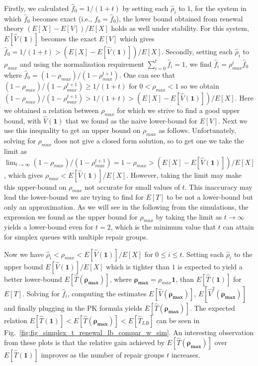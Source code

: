 \documentclass[sigconf,draft]{acmart}
\begin{document}
Firstly, we calculated $\hat{f}_0 = 1/(1+t)$ by setting each $\hat{\rho}_i$ to $1$, for the system in which $\hat{f}_0$ becomes exact (i.e., $f_0 = \hat{f}_0$), the lower bound obtained from renewal theory $(E[X]-E[V])/E[X]$ holds as well under stability. For this system, $E[\hat{V}(\bm{1})]$ becomes the exact $E[V]$ which gives $\hat{f}_0 = 1/(1+t) > (E[X]-E[\hat{V}(\bm{1})])/E[X]$. Secondly, setting each $\hat{\rho}_i$ to $\rho_{max}$ and using the normalization requirement $\sum_{i=0}^t \hat{f}_i = 1$, we find $\hat{f}_i = \rho_{max}^i \hat{f}_0$ where $\hat{f}_0 = (1-\rho_{max})/(1-\rho_{max}^{t+1})$. One can see that $(1-\rho_{max})/(1-\rho_{max}^{t+1}) \geq 1/(1+t)$ for $0 < \rho_{max} < 1$ so we obtain $(1-\rho_{max})/(1-\rho_{max}^{t+1}) > 1/(1+t) > (E[X]-E[\hat{V}(\bm{1})])/E[X]$. Here we obtained a relation between $\rho_{max}$ for which we strive to find a good upper bound, with $\hat{V}(\bm{1})$ that we found as the naive lower-bound for $E[V]$. Next we use this inequality to get an upper bound on $\rho_{max}$ as follows. Unfortunately, solving for $\rho_{max}$ does not give a closed form solution, so to get one we take the limit as $\lim_{t \to \infty} (1-\rho_{max})/(1-\rho_{max}^{t+1}) = 1-\rho_{max} > (E[X]-E[\hat{V}(\bm{1})])/E[X]$, which gives $\rho_{max} < E[\hat{V}(\bm{1})]/E[X]$. However, taking the limit may make this upper-bound on $\rho_{max}$ not accurate for small values of $t$. This inaccuracy may lead the lower-bound we are trying to find for $E[T]$ to be not a lower-bound but only an approximation. As we will see in the following from the simulations, the expression we found as the upper bound for $\rho_{max}$ by taking the limit as $t \to \infty$ yields a lower-bound even for $t=2$, which is the minimum value that $t$ can attain for simplex queues with multiple repair groups.

Now we have $\hat{\rho}_i < \rho_{max} < E[\hat{V}(\bm{1})]/E[X]$ for $0 \leq i \leq t$. Setting each $\hat{\rho}_i$ to the upper bound $E[\hat{V}(\bm{1})]/E[X]$ which is tighter than $1$ is expected to yield a better lower-bound $E[\hat{T}(\bm{\rho_{max}})]$, where $\bm{\rho_{max}} = \rho_{max}\bm{1}$, than $E[\hat{T}(\bm{1})]$ for $E[T]$. Solving for $\hat{f}_i$, computing the estimates $E[\hat{V}(\bm{\rho_{max}})]$, $E[\hat{V}^2(\bm{\rho_{max}})]$ and finally plugging in the PK formula yields $E[\hat{T}(\bm{\rho_{max}})]$. The expected relation $E[\hat{T}(\bm{1})] < E[\hat{T}(\bm{\rho_{max}})] < E[\hat{T}_{LB}]$ can be seen in Fig.~\ref{fig:fig_simplex_t_renewal_lb_compar_w_sim}. An interesting observation from these plots is that the relative gain achieved by $E[\hat{T}(\bm{\rho_{max}})]$ over $E[\hat{T}(\bm{1})]$ improves as the number of repair groups $t$ increases.
\end{document}
